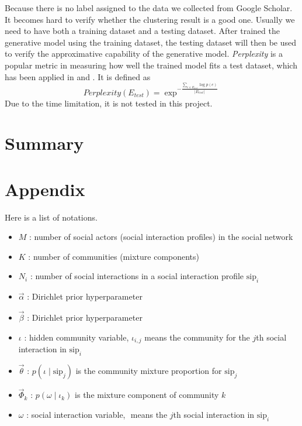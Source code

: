 \documentclass[letterpaper]{article}
\begin{document}
Because there is no label assigned to the data we collected from Google Scholar.
It becomes hard to verify whether the clustering result is a good one.
Usually we need to have both a training dataset and a testing dataset.
After trained the generative model using the training dataset, the testing dataset will then be used to verify the approximative capability of the generative model.
\emph{Perplexity} is a popular metric in measuring how well the trained model fits a test dataset, which has been applied in \cite{Cha:2012:SAU:2348283.2348360} and \cite{4258697}.
It is defined as 
\begin{equation}
Perplexity( E_{test} ) = \exp^{- \frac{ \sum_{e \in E_{test}} \log p(e) }{ | E_{test} | } }
\end{equation}
Due to the time limitation, it is not tested in this project.

\section{Summary}





\section{Appendix}
\label{sec:appendix}

Here is a list of notations.
\begin{itemize}
	\item $ M $ : number of social actors (social interaction profiles) in the social network
	\item $ K $ : number of communities (mixture components)
	\item $ N_{i} $ : number of social interactions in a social interaction profile $ \mbox{sip}_{i} $
	\item $ \vec{\alpha} $ : Dirichlet prior hyperparameter
	\item $ \vec{\beta} $ : Dirichlet prior hyperparameter
	\item $ \iota $ : hidden community variable, $ \iota_{i,j} $ means the community for the $ j $th social interaction in $ \mbox{sip}_{i} $
	\item $ \vec{\theta} $ : $ p(\iota \mid \mbox{sip}_{j}) $ is the community mixture proportion for $ \mbox{sip}_{j} $ 
	\item $ \vec{\Phi}_{k} $ : $ p(\omega \mid \iota_{k} ) $ is the mixture component of community $ k $
	\item $ \omega $ : social interaction variable, $ $ means the $ j $th social interaction in $ \mbox{sip}_{i} $
\end{itemize}
\end{document}
